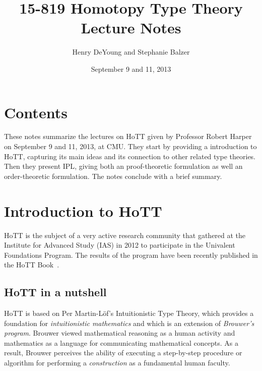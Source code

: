 \documentclass[12pt]{article}
\begin{document}
\title{15-819 Homotopy Type Theory\\ Lecture Notes}
\author{Henry DeYoung and Stephanie Balzer}
\date{September 9 and 11, 2013}

\maketitle





\section{Contents}\label{sec:contents}

These notes summarize the lectures on \ac{HoTT} given by Professor Robert
Harper on September 9 and 11, 2013, at CMU.  They start by providing a introduction to \ac{HoTT},
capturing its main ideas and its connection to other related type theories.  Then they present
\ac{IPL}, giving both an proof-theoretic formulation as
well an order-theoretic formulation.  The notes conclude with a brief summary.


\section{Introduction to \acl{HoTT}}\label{sec:intro}

\Ac{HoTT} is the subject of a very active research community that gathered at the Institute
for Advanced Study (IAS) in 2012 to participate in the Univalent Foundations Program.  The
results of the program have been recently published in the \ac{HoTT} Book~\cite{HoTTBook2013}.

\subsection{\Acs{HoTT} in a nutshell}\label{subsec:hott_in_nutshell}

\Ac{HoTT} is based on Per Martin-L\"{o}f's Intuitionistic Type Theory, which provides a
foundation for \emph{intuitionistic mathematics} and which is an extension of \emph{Brouwer's
  program}.  Brouwer viewed mathematical reasoning as a human activity and mathematics as a
language for communicating mathematical concepts.  As a result, Brouwer perceives the ability
of executing a step-by-step procedure or algorithm for performing a \emph{construction} as a
fundamental human faculty.
\end{document}
